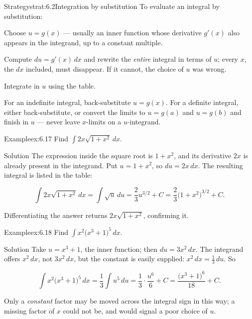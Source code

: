 \documentclass[a4paper,12pt,oneside]{memoir}
\begin{document}
\begin{envstrategy}{Strategy}{strat:6.2}{Integration by substitution}
To evaluate an integral by substitution:

\begin{steps}
  \item Choose \(u = g(x)\) — usually an inner function whose derivative \(g'(x)\) also appears in the integrand, up to a constant multiple.
  \item Compute \(du = g'(x)\,dx\) and rewrite the \emph{entire} integral in terms of \(u\); every \(x\), the \(dx\) included, must disappear. If it cannot, the choice of \(u\) was wrong.
  \item Integrate in \(u\) using the table.
  \item For an indefinite integral, back-substitute \(u = g(x)\). For a definite integral, either back-substitute, or convert the limits to \(u = g(a)\) and \(u = g(b)\) and finish in \(u\) — never leave \(x\)-limits on a \(u\)-integrand.
\end{steps}
\end{envstrategy}
\begin{workedexample}
\begin{envexample}{Example}{ex:6.17}{}
Find \(\displaystyle\int 2x\sqrt{1 + x^{2}}\,dx\).
\end{envexample}
\begin{envsolution}{Solution}{}{}
The expression inside the square root is \(1 + x^{2}\), and its derivative \(2x\) is already present in the integrand. Put \(u = 1 + x^{2}\), so \(du = 2x\,dx\). The resulting integral is listed in the table:

\[ \int 2x\sqrt{1 + x^{2}}\,dx = \int \sqrt{u}\,du = \frac{2}{3}u^{3/2} + C = \frac{2}{3}\bigl(1 + x^{2}\bigr)^{3/2} + C. \]

Differentiating the answer returns \(2x\sqrt{1 + x^{2}}\), confirming it. \qedmark
\end{envsolution}
\end{workedexample}
\begin{workedexample}
\begin{envexample}{Example}{ex:6.18}{}
Find \(\displaystyle\int x^{2}\bigl(x^{3} + 1\bigr)^{5}\,dx\).
\end{envexample}
\begin{envsolution}{Solution}{}{}
Take \(u = x^{3} + 1\), the inner function; then \(du = 3x^{2}\,dx\). The integrand offers \(x^{2}\,dx\), not \(3x^{2}\,dx\), but the constant is easily supplied: \(x^{2}\,dx = \tfrac{1}{3}\,du\). So

\[ \int x^{2}\bigl(x^{3} + 1\bigr)^{5}\,dx = \frac{1}{3}\int u^{5}\,du = \frac{1}{3}\cdot\frac{u^{6}}{6} + C = \frac{\bigl(x^{3} + 1\bigr)^{6}}{18} + C. \]

Only a \emph{constant} factor may be moved across the integral sign in this way; a missing factor of \(x\) could not be, and would signal a poor choice of \(u\). \qedmark
\end{envsolution}
\end{workedexample}
\end{document}
